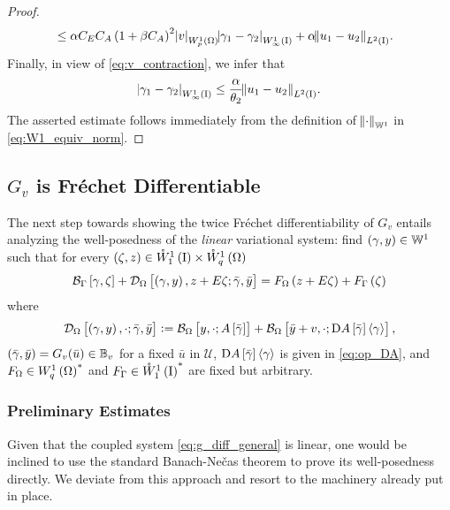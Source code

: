 \documentclass[final]{siamltex}
\begin{document}
\begin{proof}
\begin{align*}
			&\leq \alpha C_EC_A\del{1+\beta C_A}^2{\abs{{v}}_{{W^{{1}}_{{p}}\del{{\Omega}}}}} {\abs{{\gamma_1 - \gamma_2}}_{{W^{{1}}_{{\infty}}\del{{\text{\rm I}}}}}} + 
			 	\alpha{\norm{{u_1-u_2}}_{{L^2\del{{{\text{\rm I}}}}}}}.
	\end{align*}
	Finally, in view of \eqref{eq:v_contraction}, we infer that
	\begin{align} \label{eq:g_lipschitz_gamma}	
			{\abs{{\gamma_1 - \gamma_2}}_{{W^{{1}}_{{\infty}}\del{{\text{\rm I}}}}}} 
				\leq  \frac{\alpha}{\theta_2}{\norm{{u_1 - u_2}}_{{L^2\del{{{\text{\rm I}}}}}}}.
	\end{align}
	The asserted estimate follows immediately from the definition of $\norm{\cdot}_{{\mathbb{W}}^1}$ in  \eqref{eq:W1_equiv_norm}.
\end{proof}

\subsection{$G_v$ is Fr{\'e}chet Differentiable}
\label{s:g_differentiable}
The next step towards showing the twice Fr{\'e}chet differentiability of $G_v$ entails analyzing
the well-posedness of the \emph{linear} variational system: find $\del{\gamma,y} \in {\mathbb{W}}^1$ 
such that for every $\del{\zeta,z} \in {{\mathring{W}^{1}_{1}\del{{\text{\rm I}}}}} \times {{\mathring{W}^{1}_{q}\del{\Omega}}}$ 
	\begin{equation}
		{{\mathcal{B}}_\Gamma}\sbr{\gamma, \zeta} + {{\mathcal{D}}_\Omega}\sbr{\del{\gamma, y},z + E\zeta; {\bar{\gamma}}, {\bar{y}}}
			= F_\Omega\del{z+E\zeta} +  F_\Gamma\del{\zeta}
	\label{eq:g_diff_general}\end{equation}
where 
	$$
	{{\mathcal{D}}_\Omega}\sbr{\del{\gamma, y}, \cdot; {\bar{\gamma}}, {\bar{y}}} := {{\mathcal{B}}_\Omega}\sbr{y,\cdot;A\sbr{\bar{\gamma}}} + {{\mathcal{B}}_\Omega}\sbr{{\bar{y}} + v,\cdot;\Dif A\sbr{\bar{\gamma}}{\langle {\gamma} \rangle}},$$ 
$\del{{\bar{\gamma}},{\bar{y}}} = G_v({\bar{u}}) \in {\mathbb{B}}_v$ for a fixed ${\bar{u}}$ in ${\mathcal{U}}$, $\Dif A\sbr{\bar{\gamma}}{\langle \gamma \rangle}$ is given in \eqref{eq:op_DA}, and
$F_\Omega \in {{W^{{1}}_{{q}}\del{{\Omega}}}}^*$ and $F_\Gamma \in {{\mathring{W}^{{1}}_{1}\del{{\text{\rm I}}}}}^*$ are fixed but arbitrary.

\subsubsection{Preliminary Estimates}
\label{sec:G_prelim}
Given that the coupled system \eqref{eq:g_diff_general} is linear, one
would be inclined to use the standard Banach-Ne\v{c}as theorem to prove its
well-posedness directly. We deviate from this approach and resort to the machinery
already put in place.
\end{document}
